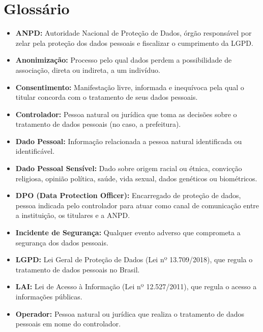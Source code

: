 \documentclass[12pt,a4paper]{article}
\begin{document}
\newpage
\section{Glossário}

\begin{itemize}
    \item \textbf{ANPD:} Autoridade Nacional de Proteção de Dados, órgão responsável por zelar pela proteção dos dados pessoais e fiscalizar o cumprimento da LGPD.
    
    \item \textbf{Anonimização:} Processo pelo qual dados perdem a possibilidade de associação, direta ou indireta, a um indivíduo.
    
    \item \textbf{Consentimento:} Manifestação livre, informada e inequívoca pela qual o titular concorda com o tratamento de seus dados pessoais.
    
    \item \textbf{Controlador:} Pessoa natural ou jurídica que toma as decisões sobre o tratamento de dados pessoais (no caso, a prefeitura).
    
    \item \textbf{Dado Pessoal:} Informação relacionada a pessoa natural identificada ou identificável.
    
    \item \textbf{Dado Pessoal Sensível:} Dado sobre origem racial ou étnica, convicção religiosa, opinião política, saúde, vida sexual, dados genéticos ou biométricos.
    
    \item \textbf{DPO (Data Protection Officer):} Encarregado de proteção de dados, pessoa indicada pelo controlador para atuar como canal de comunicação entre a instituição, os titulares e a ANPD.
    
    \item \textbf{Incidente de Segurança:} Qualquer evento adverso que comprometa a segurança dos dados pessoais.
    
    \item \textbf{LGPD:} Lei Geral de Proteção de Dados (Lei nº 13.709/2018), que regula o tratamento de dados pessoais no Brasil.
    
    \item \textbf{LAI:} Lei de Acesso à Informação (Lei nº 12.527/2011), que regula o acesso a informações públicas.
    
    \item \textbf{Operador:} Pessoa natural ou jurídica que realiza o tratamento de dados pessoais em nome do controlador.
    

\end{itemize}
\end{document}
